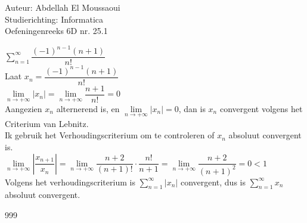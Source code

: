 \documentclass[a4paper]{article}
\begin{document}
  
\noindent \large Auteur: Abdellah El Moussaoui \\
\noindent \large Studierichting: Informatica\\
\noindent \large Oefeningenreeks 6D nr. 25.1\\

\medskip

\normalsize


$\displaystyle\sum_{n=1}^{\infty}\dfrac{\left(-1\right)^{n-1}\left(n+1\right)}{n!}$\\

Laat $x_n = \dfrac{\left(-1\right)^{n-1}\left(n+1\right)}{n!}$\\

$ \lim\limits_{n\to+\infty} \left|x_n\right| =  \lim\limits_{n\to+\infty} \dfrac{n+1}{n!} = 0$\\

Aangezien $x_n$ alternerend is, en $\lim\limits_{n\to+\infty} \left|x_n\right| = 0$, dan is $x_n$ convergent volgens het Criterium van Lebnitz.\\

Ik gebruik het Verhoudingscriterium om te controleren of $x_n$ absoluut convergent is.\\

$ \lim\limits_{n\to+\infty} \left| \dfrac{x_{n+1}}{x_n}\right| =  \lim\limits_{n\to+\infty} \dfrac{n+2}{\left(n+1\right)!} \cdot \dfrac{n!}{n+1} = 
\lim\limits_{n\to+\infty} \dfrac{n+2}{\left(n+1\right)^2}= 0 < 1$\\

Volgens het verhoudingscriterium is $\displaystyle\sum_{n=1}^{\infty}\left|x_n\right|$ convergent, dus is $\displaystyle\sum_{n=1}^{\infty}x_n$ absoluut convergent.\\


\begin{thebibliography}{999}
\end{thebibliography}
\end{document}
